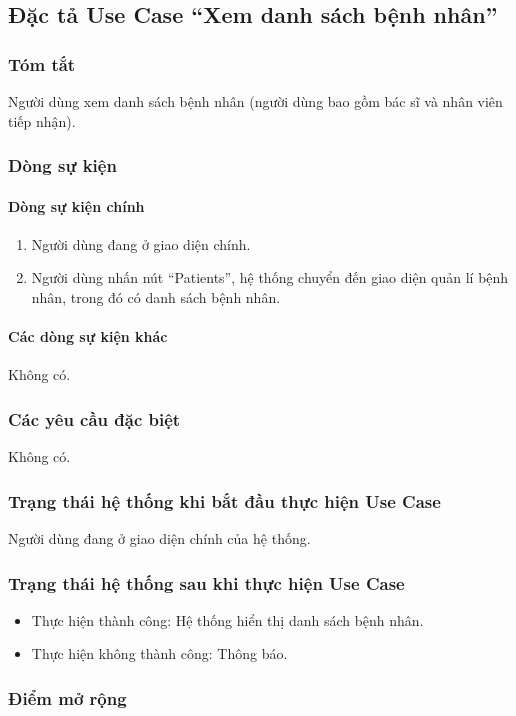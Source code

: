 \subsection{Đặc tả Use Case ``Xem danh sách bệnh nhân''}

\subsubsection{Tóm tắt}
Người dùng xem danh sách bệnh nhân (người dùng bao gồm bác sĩ và nhân viên tiếp nhận).

\subsubsection{Dòng sự kiện}
\paragraph{\textbf{Dòng sự kiện chính}}
\begin{enumerate}
  \item Người dùng đang ở giao diện chính.
  \item Người dùng nhấn nút ``Patients'', hệ thống chuyển đến giao diện quản lí bệnh nhân, trong đó có danh sách bệnh nhân.
\end{enumerate}

\paragraph{\textbf{Các dòng sự kiện khác}}
Không có.

\subsubsection{Các yêu cầu đặc biệt}
Không có.

\subsubsection{Trạng thái hệ thống khi bắt đầu thực hiện Use Case}
Người dùng đang ở giao diện chính của hệ thống.

\subsubsection{Trạng thái hệ thống sau khi thực hiện Use Case}
\begin{itemize}
  \item Thực hiện thành công: Hệ thống hiển thị danh sách bệnh nhân.
  \item Thực hiện không thành công: Thông báo.
\end{itemize}

\subsubsection{Điểm mở rộng}
